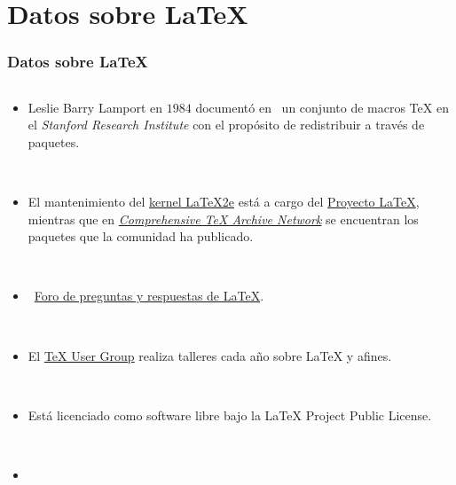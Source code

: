 \section{Datos sobre \LaTeX}

\begin{frame}
	\frametitle{Datos sobre \LaTeX}

	\begin{columns}
		\begin{column}{.58\paperwidth}
			\begin{itemize}[<+->]
				\item

				      Leslie Barry Lamport en $1984$ documentó
				      en~\cite{Lamport1994} un conjunto de macros \TeX{} en
				      el \emph{Stanford Research Institute} con el propósito
				      de redistribuir a través de paquetes.

				      \

				\item

				      El mantenimiento del
				      \href{https://github.com/latex3/latex2e}{kernel \LaTeX{}2e}
				      está a cargo del
				      \href{https://www.latex-project.org/about/team}{Proyecto \LaTeX},
				      mientras que en
				      \href{https://ctan.org}{\emph{Comprehensive \TeX{} Archive Network}}
				      se encuentran los paquetes que la comunidad ha
				      publicado.

				      \

				\item

				      \textcolor{cyan}{}~\href{https://tex.stackexchange.com}{Foro
					      de preguntas y respuestas de \LaTeX{}}.

				      \

				\item

				      El \href{https://tug.org}{\TeX{} User Group}
				      realiza talleres cada año sobre \LaTeX{} y afines.

				      \

				\item

				      Está licenciado como software libre bajo la \LaTeX{}
				      Project Public License.

				      \

				\item


\end{itemize}
\end{column}
\end{columns}
\end{frame}
